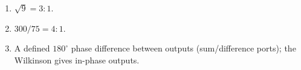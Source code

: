 \begin{enumerate}[leftmargin=1.6em,itemsep=2pt]
\item $\sqrt{9} = 3{:}1$.
\item $300/75 = 4{:}1$.
\item A defined $180^{\circ}$ phase difference between outputs (sum/difference ports); the Wilkinson gives in-phase outputs.
\end{enumerate}
